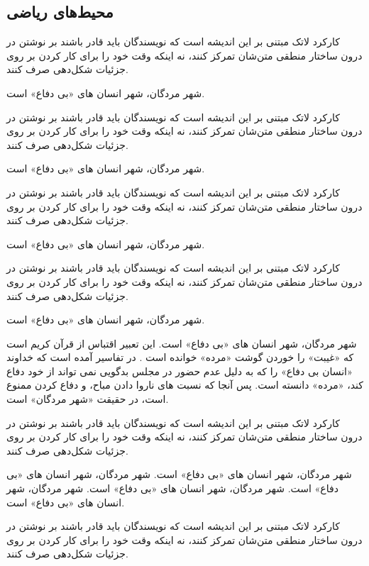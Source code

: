 \subsection{محیط‌های ریاضی}
کارکرد لاتک مبتنی بر این اندیشه است که نویسندگان باید قادر باشند بر نوشتن در درون ساختار منطقی متن‌شان تمرکز کنند، نه اینکه وقت خود را برای کار کردن بر روی جزئیات شکل‌دهی صرف کنند. 
\begin{ntdefinition}
شهر مردگان، شهر انسان های «بی دفاع» است. 
\end{ntdefinition}
کارکرد لاتک مبتنی بر این اندیشه است که نویسندگان باید قادر باشند بر نوشتن در درون ساختار منطقی متن‌شان تمرکز کنند، نه اینکه وقت خود را برای کار کردن بر روی جزئیات شکل‌دهی صرف کنند. 
\begin{ntdefinition}
شهر مردگان، شهر انسان های «بی دفاع» است. 
\end{ntdefinition}
کارکرد لاتک مبتنی بر این اندیشه است که نویسندگان باید قادر باشند بر نوشتن در درون ساختار منطقی متن‌شان تمرکز کنند، نه اینکه وقت خود را برای کار کردن بر روی جزئیات شکل‌دهی صرف کنند. 
\begin{ntexample}
شهر مردگان، شهر انسان های «بی دفاع» است. 
\end{ntexample}
کارکرد لاتک مبتنی بر این اندیشه است که نویسندگان باید قادر باشند بر نوشتن در درون ساختار منطقی متن‌شان تمرکز کنند، نه اینکه وقت خود را برای کار کردن بر روی جزئیات شکل‌دهی صرف کنند. 
\begin{ntexample}
شهر مردگان، شهر انسان های «بی دفاع» است. 
\end{ntexample}
\begin{ntsolution}
شهر مردگان، شهر انسان های «بی دفاع» است. این تعبیر اقتباس از قرآن کریم است که «غیبت» را خوردن گوشت «مرده» خوانده است . در تفاسیر آمده است که خداوند «انسان بی دفاع» را که به دلیل عدم حضور در مجلس بدگویی نمی تواند از خود دفاع کند، «مرده» دانسته است. پس آنجا که نسبت های ناروا دادن مباح، و دفاع کردن ممنوع است، در حقیقت «شهر مردگان» است.
\end{ntsolution}
کارکرد لاتک مبتنی بر این اندیشه است که نویسندگان باید قادر باشند بر نوشتن در درون ساختار منطقی متن‌شان تمرکز کنند، نه اینکه وقت خود را برای کار کردن بر روی جزئیات شکل‌دهی صرف کنند. 

\begin{ntpoint}

شهر مردگان، شهر انسان های «بی دفاع» است. شهر مردگان، شهر انسان های «بی دفاع» است. شهر مردگان، شهر انسان های «بی دفاع» است. شهر مردگان، شهر انسان های «بی دفاع» است. 
\end{ntpoint}
کارکرد لاتک مبتنی بر این اندیشه است که نویسندگان باید قادر باشند بر نوشتن در درون ساختار منطقی متن‌شان تمرکز کنند، نه اینکه وقت خود را برای کار کردن بر روی جزئیات شکل‌دهی صرف کنند. 

